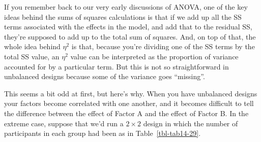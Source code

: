 \documentclass[
  a4paper,
]{book}
\begin{document}
If you remember back to our very early discussions of ANOVA, one of the
key ideas behind the sums of squares calculations is that if we add up
all the SS terms associated with the effects in the model, and add that
to the residual SS, they're supposed to add up to the total sum of
squares. And, on top of that, the whole idea behind \(\eta^2\) is that,
because you're dividing one of the SS terms by the total SS value, an
\(\eta^2\) value can be interpreted as the proportion of variance
accounted for by a particular term. But this is not so straightforward
in unbalanced designs because some of the variance goes ``missing''.

This seems a bit odd at first, but here's why. When you have unbalanced
designs your factors become correlated with one another, and it becomes
difficult to tell the difference between the effect of Factor A and the
effect of Factor B. In the extreme case, suppose that we'd run a
\(2 \times 2\) design in which the number of participants in each group
had been as in Table~\ref{tbl-tab14-29}.

\hypertarget{tbl-tab14-29}{}
 
  \providecommand{\huxb}[2]{\arrayrulecolor[RGB]{#1}\global\arrayrulewidth=#2pt}
  \providecommand{\huxvb}[2]{\color[RGB]{#1}\vrule width #2pt}
  \providecommand{\huxtpad}[1]{\rule{0pt}{#1}}
  \providecommand{\huxbpad}[1]{\rule[-#1]{0pt}{#1}}
\end{document}
